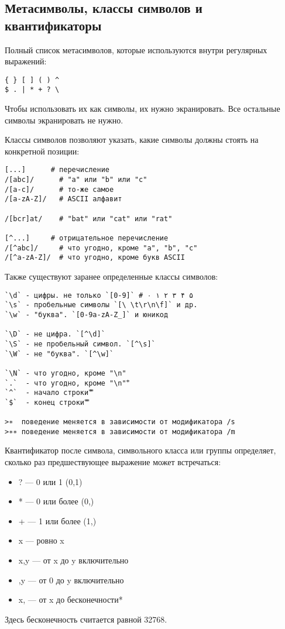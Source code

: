 \subsection{Метасимволы, классы символов и квантификаторы} %
Полный список метасимволов, которые используются внутри регулярных выражений:
\begin{verbatim}
{ } [ ] ( ) ^
$ . | * + ? \
\end{verbatim}
Чтобы использовать их как символы, их нужно экранировать. Все остальные символы экранировать не нужно.

Классы символов позволяют указать, какие символы должны стоять на конкретной позиции:
\begin{verbatim}
[...]      # перечисление
/[abc]/      # "a" или "b" или "c"
/[a-c]/      # то-же самое
/[a-zA-Z]/   # ASCII алфавит

/[bcr]at/    # "bat" или "cat" или "rat"

[^...]     # отрицательное перечисление
/[^abc]/     # что угодно, кроме "a", "b", "c"
/[^a-zA-Z]/  # что угодно, кроме букв ASCII
\end{verbatim}
Также существуют заранее определенные классы символов:
\begin{verbatim}
`\d` - цифры. не только `[0-9]` # ۰ ۱ ۲ ۳ ۴ ۵
`\s` - пробельные символы `[\ \t\r\n\f]` и др.
`\w` - "буква". `[0-9a-zA-Z_]` и юникод

`\D` - не цифра. `[^\d]`
`\S` - не пробельный символ. `[^\s]`
`\W` - не "буква". `[^\w]`

`\N` - что угодно, кроме "\n"
`.`  - что угодно, кроме "\n" ⃰
`^`  - начало строки ⃰ ⃰
`$`  - конец строки ⃰ ⃰

>∗  поведение меняется в зависимости от модификатора /s
>∗∗ поведение меняется в зависимости от модификатора /m
\end{verbatim}

Квантификатор после символа, символьного класса или группы определяет, сколько раз предшествующее выражение может встречаться:
\begin{itemize}[nosep]
 \item ? --- 0 или 1 ({0,1})
 \item * --- 0 или более ({0,})
 \item + --- 1 или более ({1,})
 \item {x} --- ровно x
 \item {x,y} --- от x до y включительно
 \item {,y} --- от 0 до y включительно
 \item {x,} --- от x до бесконечности*
\end{itemize}
Здесь бесконечность считается равной 32768.

